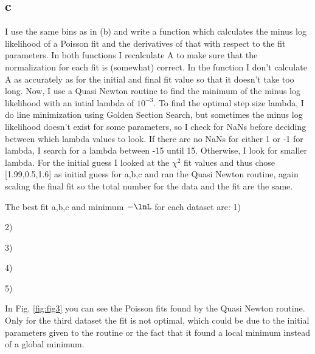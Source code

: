 \subsection*{c}

I use the same bins as in (b) and write a function which calculates the minus log likelihood of a Poisson fit and the derivatives of that with respect to the fit parameters. In both functions I recalculate A to make sure that the normalization for each fit is (somewhat) correct. In the function I don't calculate A as accurately as for the initial and final fit value so that it doesn't take too long. 
Now, I use a Quasi Newton routine to find the minimum of the minus log likelihood with an intial lambda of $10^{-3}$. To find the optimal step size lambda, I do line minimization using Golden Section Search, but sometimes the minus log likelihood doesn't exist for some parameters, so I check for NaNs before deciding between which lambda values to look. If there are no NaNs for either 1 or -1 for lambda, I search for a lambda between -15 until 15. Otherwise, I look for smaller lambda. 
For the initial guess I looked at the $\chi^2$ fit values and thus chose [1.99,0.5,1.6] as initial guess for a,b,c and ran the Quasi Newton routine, again scaling the final fit so the total number for the data and the fit are the same.

The best fit a,b,c and minimum $-\lnL$ for each dataset are: 1)

2)

3)

4)

5)



In Fig. \ref{fig:fig3} you can see the Poisson fits found by the Quasi Newton routine. Only for the third dataset the fit is not optimal, which could be due to the initial parameters given to the routine or the fact that it found a local minimum instead of a global minimum. 

